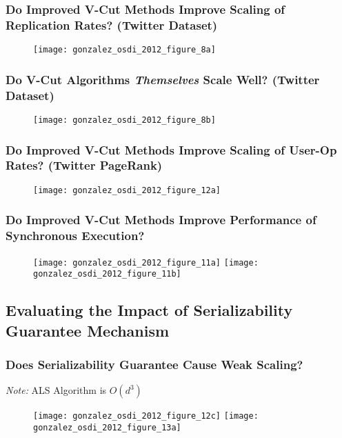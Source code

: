 \begin{frame}
  \frametitle{\small{Do Improved V-Cut Methods Improve Scaling of Replication
              Rates? (Twitter Dataset)}}
  \centering
  \begin{figure}
    \texttt{[image: gonzalez\_osdi\_2012\_figure\_8a]}
    \caption{\cite[OSDI '12]{gonzalez2012powergraph}}
  \end{figure}
\end{frame}

\begin{frame}
  \frametitle{\small Do V-Cut Algorithms \textit{Themselves} Scale Well?
              (Twitter Dataset)}
  \centering
  \begin{figure}
    \texttt{[image: gonzalez\_osdi\_2012\_figure\_8b]}
    \caption{\cite[OSDI '12]{gonzalez2012powergraph}}
  \end{figure}
\end{frame}

\begin{frame}
  \frametitle{\small Do Improved V-Cut Methods Improve Scaling of User-Op Rates?
              (Twitter PageRank)}
  \centering
  \begin{figure}
    \texttt{[image: gonzalez\_osdi\_2012\_figure\_12a]}
    \caption{\cite[OSDI '12]{gonzalez2012powergraph}}
  \end{figure}
\end{frame}

\begin{frame}
  \frametitle{\small Do Improved V-Cut Methods Improve Performance of
              Synchronous Execution?}
  \centering
  \begin{figure}
    \texttt{[image: gonzalez\_osdi\_2012\_figure\_11a]}%
    \texttt{[image: gonzalez\_osdi\_2012\_figure\_11b]}
    \caption{\cite[OSDI '12]{gonzalez2012powergraph}}
  \end{figure}
\end{frame}


\subsection{Evaluating the Impact of Serializability Guarantee Mechanism}

\begin{frame}
  \frametitle{\small Does Serializability Guarantee Cause Weak Scaling?}
  \centering
  \textit{Note:} ALS Algorithm is $O(d^3)$
  \begin{figure}
    \texttt{[image: gonzalez\_osdi\_2012\_figure\_12c]}%
    \texttt{[image: gonzalez\_osdi\_2012\_figure\_13a]}
    \caption{\cite[OSDI '12]{gonzalez2012powergraph}}
  \end{figure}
\end{frame}


